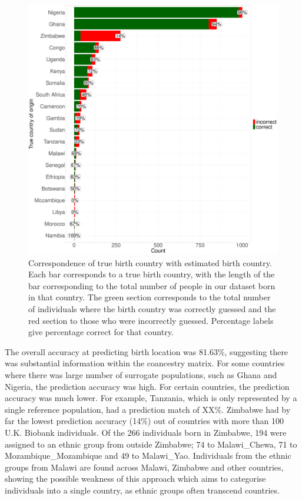 \begin{figure}[htp]
    \centering
    \includegraphics[width=1.0\textwidth]{../images/chapter3/country_of_origin_allInds.pdf}
    \caption{Correspondence of true birth country with estimated birth country. Each bar corresponds to a true birth country, with the length of the bar corresponding to the total number of people in our dataset born in that country. The green section corresponds to the total number of individuals where the birth country was correctly guessed and the red section to those who were incorrectly guessed. Percentage labels give percentage correct for that country.}
    \label{fig:country_of_origin_allInds}
\end{figure}

The overall accuracy at predicting birth location was 81.63\%, suggesting there was substantial information within the coancestry matrix. For some countries where there was large number of surrogate populations, such as Ghana and Nigeria, the prediction accuracy was high. For certain countries, the prediction accuracy was much lower. For example, Tanzania, which is only represented by a single reference population, had a prediction match of XX\%. Zimbabwe had by far the lowest prediction accuracy (14\%) out of countries with more than 100 U.K. Biobank individuals. Of the 266 individuals born in Zimbabwe, 194 were assigned to an ethnic group from outside Zimbabwe; 74 to Malawi\_Chewa, 71 to Mozambique\_Mozambique and 49 to Malawi\_Yao. Individuals from the ethnic groups from Malawi are found across Malawi, Zimbabwe and other countries, showing the possible weakness of this approach which aims to categorise individuals into a single country, as ethnic groups often transcend countries. 

